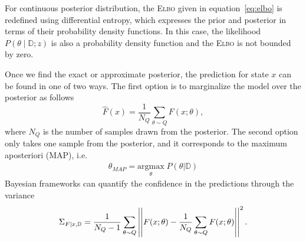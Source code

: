 \begin{rem}
  For continuous posterior distribution, the \textsc{Elbo} given in
  equation~\eqref{eq:elbo} is redefined using differential entropy, which
  expresses the prior and posterior in terms of their probability density
  functions. In this case, the likelihood $P(\theta \mid \mathbb{D};z)$ is also
  a probability density function and the \textsc{Elbo} is not bounded by zero.
\end{rem}


Once we find the exact or approximate posterior, the prediction for state $x$
can be found in one of two ways. The first option is to marginalize the model
over the posterior as follows~\cite{jospin2020hands}
\begin{equation}
  \hat{F}(x) = \frac{1}{N_Q} \sum_{\theta \sim Q} F(x; \theta),
  \label{eqn:marginalization}
\end{equation} 
where $N_Q$ is the number of samples drawn from the posterior. 
%
The second option only takes one sample from the posterior, and it corresponds
to the maximum aposteriori (MAP), i.e. 
\begin{align} 
  \theta_{MAP}=\underset{\theta}{\textrm{argmax}}\; P(\theta | \mathbb{D})
\end{align}
Bayesian frameworks can quantify the confidence in the
predictions through the variance~\cite{jospin2020hands}
\begin{equation}
  \Sigma_{F \mid x,\mathbb{D}} = \frac{1}{N_Q-1} \sum_{\theta \sim Q} \left|\left|F(x; \theta) - \frac{1}{N_Q} \sum_{\theta \sim Q} F(x; \theta)\right|\right|^2.
  \label{eqn:predictive_variance}
\end{equation}
%
